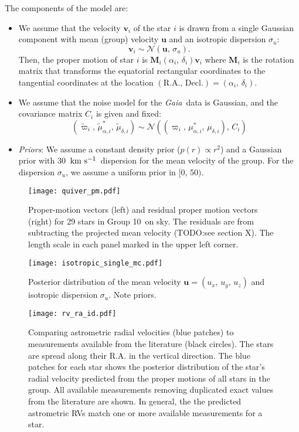 \documentclass[modern,letterpaper]{aastex61}
\newcommand{\project}[1]{\textsl{#1}}
\newcommand{\gaia}{\project{Gaia}}
\newcommand{\groupTen}{Group 10}
\newcommand{\normal}{{\mathcal{N}}}
\newcommand{\bs}[1]{\boldsymbol{#1}}
\newcommand{\mat}[1]{\mathbf{#1}}
\renewcommand{\vec}[1]{\bs{#1}}
\newcommand{\kms}{\ensuremath{\rm km~s^{-1}}}
\newcommand{\todo}[1]{{\color{crimson}TODO:#1}}
\begin{document}
The components of the model are:
\begin{itemize}
  \item We assume that the velocity $\vec{v}_i$ of the star $i$ is drawn from
    a single Gaussian component with mean (group) velocity $\vec{u}$ and
    an isotropic dispersion $\sigma_{u}$:
    $$\vec{v}_i \sim \normal(\vec{u},\,\sigma_{u}).$$
    Then, the proper motion of star $i$ is $\mat{M}_i(\alpha_i,\,\delta_i)\vec{v}_i$ where
    $\mat{M}_i$ is the rotation matrix that transforms the equatorial rectangular coordinates
    to the tangential coordinates at the location $(\mathrm{R.A.},\,\mathrm{Decl.}) = (\alpha_i,\,\delta_i)$.

  \item We assume that the noise model for the \gaia\ data is Gaussian, and
    the covariance matrix $C_i$ is given and fixed:
    $$(\tilde\varpi_i,\,\tilde\mu_{\alpha,i}^*,\,\tilde\mu_{\delta,i}) \sim
      \normal((\varpi_i,\,\mu_{\alpha,i}^*,\,\mu_{\delta,i}),\,C_i)$$

  \item \emph{Priors}: We assume a constant density prior ($p(r) \propto r^2$) and a Gaussian
    prior with 30~\kms\ dispersion for the mean velocity of the group.
    For the dispersion $\sigma_u$, we assume a uniform prior in $[0,\,50)$.
\end{itemize}


\begin{figure}
  \centering
  \texttt{[image: quiver\_pm.pdf]}
  \caption{Proper-motion vectors (left) and residual proper motion vectors (right)
    for 29 stars in \groupTen\ on sky.
    The residuals are from subtracting the projected mean velocity (\todo{see section X}).
    The length scale in each panel marked in the upper left corner.
  }
  \label{fig:quiver_pm}
\end{figure}

\begin{figure}
  \centering
  \texttt{[image: isotropic\_single\_mc.pdf]}
  \caption{
    Posterior distribution of the mean velocity $\vec{u} = (u_x,\,u_y,\,u_z)$ and
    isotropic dispersion $\sigma_u$.
    Note priors.
  }
  \label{}
\end{figure}

\begin{figure}
  \centering
  \texttt{[image: rv\_ra\_id.pdf]}
  \caption{
    Comparing astrometric radial velocities (blue patches) to
    measurements available from the literature (black circles).
    The stars are spread along their R.A. in the vertical direction.
    The blue patches for each star shows the posterior distribution
    of the star's radial velocity predicted from the proper motions of
    all stars in the group.
    All available measurements removing duplicated exact values from
    the literature are shown.
    In general, the the predicted astrometric RVs match one or more
    available measurements for a star.
  }
  \label{fig:rv_ra_id}
\end{figure}
\end{document}
